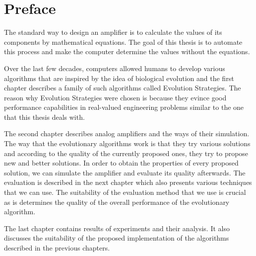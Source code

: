 \chapter{Preface}
The standard way to design an amplifier is to calculate the values of its components by mathematical equations. The goal of this thesis is to automate this process and make the computer determine the values without the equations.

Over the last few decades, computers allowed humans to develop various algorithms that are inspired by the idea of biological evolution and the first chapter describes a family of such algorithms called Evolution Strategies. The reason why Evolution Strategies were chosen is because they evince good performance capabilities in real-valued engineering problems similar to the one that this thesis deals with.

The second chapter describes analog amplifiers and the ways of their simulation. The way that the evolutionary algorithms work is that they try various solutions and according to the quality of the currently proposed ones, they try to propose new and better solutions. In order to obtain the properties of every proposed solution, we can simulate the amplifier and evaluate its quality afterwards. The evaluation is described in the next chapter which also presents various techniques that we can use. The suitability of the evaluation method that we use is crucial as is determines the quality of the overall performance of the evolutionary algorithm.

The last chapter contains results of experiments and their analysis. It also discusses the suitability of the proposed implementation of the algorithms described in the previous chapters.